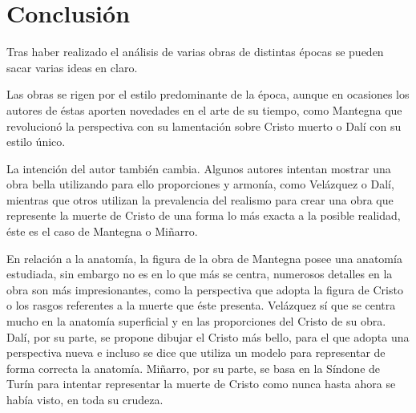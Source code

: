 \section{Conclusión}
Tras haber realizado el análisis de varias obras de distintas épocas se pueden sacar varias ideas en claro.

Las obras se rigen por el estilo predominante de la época, aunque en ocasiones los autores de éstas aporten novedades en el arte de su tiempo, como Mantegna que revolucionó la perspectiva con su lamentación sobre Cristo muerto o Dalí con su estilo único.

La intención del autor también cambia. Algunos autores intentan mostrar una obra bella utilizando para ello proporciones y armonía, como Velázquez o Dalí, mientras que otros utilizan la prevalencia del realismo para crear una obra que represente la muerte de Cristo de una forma lo más exacta a la posible realidad, éste es el caso de Mantegna o Miñarro.

En relación a la anatomía, %
la figura de la obra de Mantegna posee una anatomía estudiada, sin embargo no es en lo que más se centra, numerosos detalles en la obra son más impresionantes, como la perspectiva que adopta la figura de Cristo o los rasgos referentes a la muerte que éste presenta. Velázquez sí que se centra mucho en la anatomía superficial y en las proporciones del Cristo de su obra. Dalí, por su parte, se propone dibujar el Cristo más bello, para el que adopta una perspectiva nueva e incluso se dice que utiliza un modelo para representar de forma correcta la anatomía. Miñarro, por su parte, se basa en la Síndone de Turín para intentar representar la muerte de Cristo como nunca hasta ahora se había visto, en toda su crudeza.


